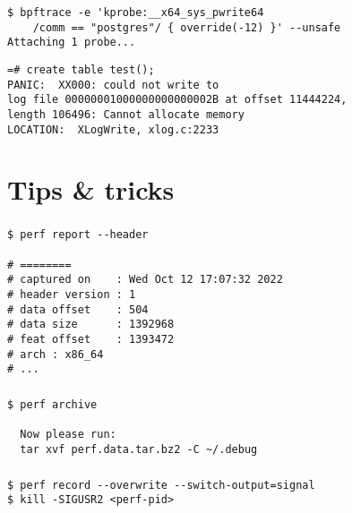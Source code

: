 \documentclass[usenames,dvipsnames, 18pt, compress, aspectratio=169]{beamer}
\begin{document}
\begin{frame}[fragile]{}
    \frametitle{}
    \begin{center}
        \begin{verbatim}
$ bpftrace -e 'kprobe:__x64_sys_pwrite64
    /comm == "postgres"/ { override(-12) }' --unsafe
Attaching 1 probe...
        \end{verbatim}

        \begin{verbatim}
=# create table test();
PANIC:  XX000: could not write to
log file 00000001000000000000002B at offset 11444224,
length 106496: Cannot allocate memory
LOCATION:  XLogWrite, xlog.c:2233
        \end{verbatim}
    \end{center}
\end{frame}

\section{Tips \& tricks}

\begin{frame}[fragile]{}
    \frametitle{}
    \begin{center}
        \begin{verbatim}
$ perf report --header

# ========
# captured on    : Wed Oct 12 17:07:32 2022
# header version : 1
# data offset    : 504
# data size      : 1392968
# feat offset    : 1393472
# arch : x86_64
# ...
        \end{verbatim}
    \end{center}
\end{frame}

\begin{frame}[fragile]{}
    \frametitle{}
    \begin{center}
        \begin{verbatim}
$ perf archive

  Now please run:
  tar xvf perf.data.tar.bz2 -C ~/.debug
        \end{verbatim}
    \end{center}
\end{frame}

\begin{frame}[fragile]{}
    \frametitle{}
    \begin{center}
        \begin{verbatim}
$ perf record --overwrite --switch-output=signal
$ kill -SIGUSR2 <perf-pid>
        \end{verbatim}
    \end{center}
\end{frame}
\end{document}
